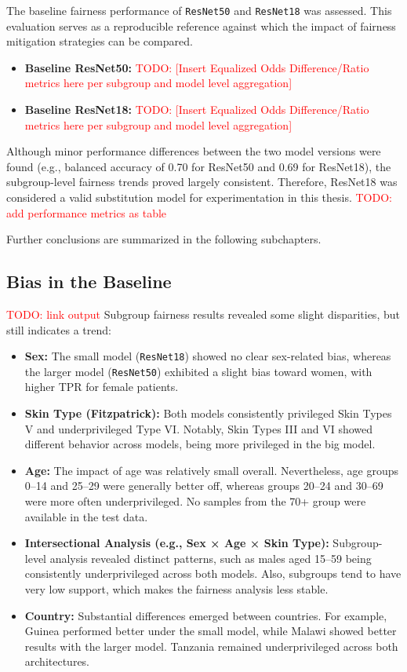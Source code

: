 \documentclass[12pt, a4paper, oneside]{book}   	%
\renewcommand{\todo}[1]{\textcolor{red}{TODO: #1}}
\begin{document}
		The baseline fairness performance of \texttt{ResNet50} and \texttt{ResNet18} was assessed. This evaluation serves as a reproducible reference against which the impact of fairness mitigation strategies can be compared.
		
		\begin{itemize}
			\item \textbf{Baseline ResNet50:} \todo{[Insert Equalized Odds Difference/Ratio metrics here per subgroup and model level aggregation]}
			\item \textbf{Baseline ResNet18:} \todo{[Insert Equalized Odds Difference/Ratio metrics here per subgroup and model level aggregation]}
		\end{itemize}
		
		Although minor performance differences between the two model versions were found (e.g., balanced accuracy of 0.70 for ResNet50 and 0.69 for ResNet18), the subgroup-level fairness trends proved largely consistent. Therefore, ResNet18 was considered a valid substitution model for experimentation in this thesis.
		\todo{add performance metrics as table}
		
		Further conclusions are summarized in the following subchapters.
		
		\subsection{Bias in the Baseline}
		\todo{link output}
		Subgroup fairness results revealed some slight disparities, but still indicates a trend:
		
		\begin{itemize}
			\item \textbf{Sex:} The small model (\texttt{ResNet18}) showed no clear sex-related bias, whereas the larger model (\texttt{ResNet50}) exhibited a slight bias toward women, with higher \gls{TPR} for female patients.
			\item \textbf{Skin Type (Fitzpatrick):} Both models consistently privileged Skin Types V and underprivileged Type VI. Notably, Skin Types III and VI showed different behavior across models, being more privileged in the big model.
			\item \textbf{Age:} The impact of age was relatively small overall. Nevertheless, age groups 0–14 and 25–29 were generally better off, whereas groups 20–24 and 30–69 were more often underprivileged. No samples from the 70+ group were available in the test data.
			\item \textbf{Intersectional Analysis (e.g., Sex × Age × Skin Type):} Subgroup-level analysis revealed distinct patterns, such as males aged 15–59 being consistently underprivileged across both models. Also, subgroups tend to have very low support, which makes the fairness analysis less stable.
			\item \textbf{Country:} Substantial differences emerged between countries. For example, Guinea performed better under the small model, while Malawi showed better results with the larger model. Tanzania remained underprivileged across both architectures.
		\end{itemize}
		
\end{document}
